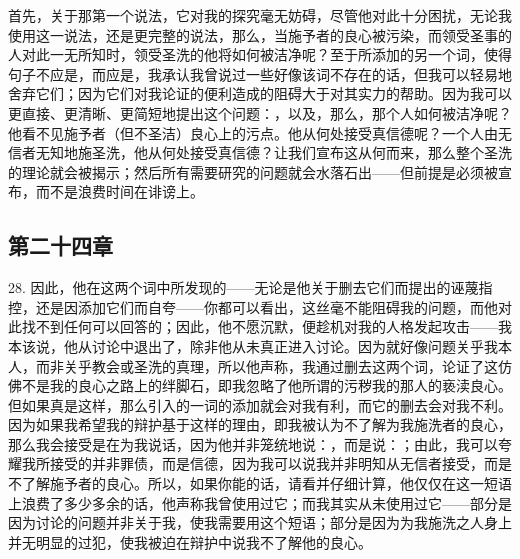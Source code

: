 首先，关于那第一个说法，它对我的探究毫无妨碍，尽管他对此十分困扰，无论我使用这一说法，还是更完整的说法，那么，当施予者的良心被污染，而领受圣事的人对此一无所知时，领受圣洗的他将如何被洁净呢？至于所添加的另一个词，使得句子不应是，而应是，我承认我曾说过一些好像该词不存在的话，但我可以轻易地舍弃它们；因为它们对我论证的便利造成的阻碍大于对其实力的帮助。因为我可以更直接、更清晰、更简短地提出这个问题：，以及，那么，那个人如何被洁净呢？他看不见施予者（但不圣洁）良心上的污点。他从何处接受真信德呢？一个人由无信者无知地施圣洗，他从何处接受真信德？让我们宣布这从何而来，那么整个圣洗的理论就会被揭示；然后所有需要研究的问题就会水落石出——但前提是必须被宣布，而不是浪费时间在诽谤上。\par


\subsection{第二十四章}

28. 因此，他在这两个词中所发现的——无论是他关于删去它们而提出的诬蔑指控，还是因添加它们而自夸——你都可以看出，这丝毫不能阻碍我的问题，而他对此找不到任何可以回答的；因此，他不愿沉默，便趁机对我的人格发起攻击——我本该说，他从讨论中退出了，除非他从未真正进入讨论。因为就好像问题关乎我本人，而非关乎教会或圣洗的真理，所以他声称，我通过删去这两个词，论证了这仿佛不是我的良心之路上的绊脚石，即我忽略了他所谓的污秽我的那人的亵渎良心。但如果真是这样，那么引入的一词的添加就会对我有利，而它的删去会对我不利。因为如果我希望我的辩护基于这样的理由，即我被认为不了解为我施洗者的良心，那么我会接受是在为我说话，因为他并非笼统地说：，而是说：；由此，我可以夸耀我所接受的并非罪债，而是信德，因为我可以说我并非明知从无信者接受，而是不了解施予者的良心。所以，如果你能的话，请看并仔细计算，他仅仅在这一短语上浪费了多少多余的话，他声称我曾使用过它；而我其实从未使用过它——部分是因为讨论的问题并非关于我，使我需要用这个短语；部分是因为为我施洗之人身上并无明显的过犯，使我被迫在辩护中说我不了解他的良心。\par

